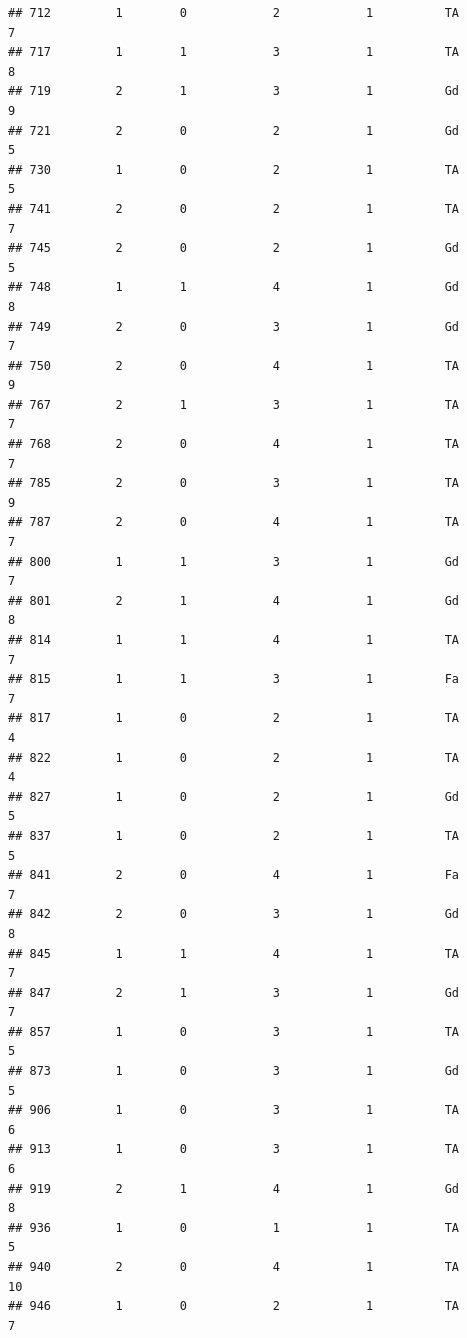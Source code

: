 \documentclass[]{article}
\begin{document}
\begin{verbatim}
## 712         1        0            2            1          TA            7
## 717         1        1            3            1          TA            8
## 719         2        1            3            1          Gd            9
## 721         2        0            2            1          Gd            5
## 730         1        0            2            1          TA            5
## 741         2        0            2            1          TA            7
## 745         2        0            2            1          Gd            5
## 748         1        1            4            1          Gd            8
## 749         2        0            3            1          Gd            7
## 750         2        0            4            1          TA            9
## 767         2        1            3            1          TA            7
## 768         2        0            4            1          TA            7
## 785         2        0            3            1          TA            9
## 787         2        0            4            1          TA            7
## 800         1        1            3            1          Gd            7
## 801         2        1            4            1          Gd            8
## 814         1        1            4            1          TA            7
## 815         1        1            3            1          Fa            7
## 817         1        0            2            1          TA            4
## 822         1        0            2            1          TA            4
## 827         1        0            2            1          Gd            5
## 837         1        0            2            1          TA            5
## 841         2        0            4            1          Fa            7
## 842         2        0            3            1          Gd            8
## 845         1        1            4            1          TA            7
## 847         2        1            3            1          Gd            7
## 857         1        0            3            1          TA            5
## 873         1        0            3            1          Gd            5
## 906         1        0            3            1          TA            6
## 913         1        0            3            1          TA            6
## 919         2        1            4            1          Gd            8
## 936         1        0            1            1          TA            5
## 940         2        0            4            1          TA           10
## 946         1        0            2            1          TA            7

\end{verbatim}
\end{document}
